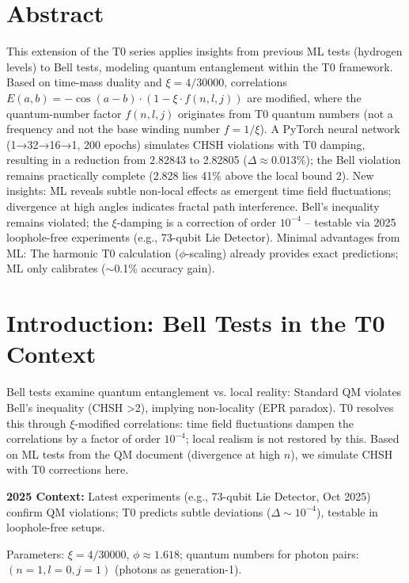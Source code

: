 \section*{Abstract}
		This extension of the T0 series applies insights from previous ML tests (hydrogen levels) to Bell tests, modeling quantum entanglement within the T0 framework. Based on time-mass duality and $\xi = 4/30000$, correlations $E(a,b) = -\cos(a-b) \cdot (1 - \xi \cdot f(n,l,j))$ are modified, where the quantum-number factor $f(n,l,j)$ originates from T0 quantum numbers (not a frequency and not the base winding number $f = 1/\xi$). A PyTorch neural network (1→32→16→1, 200 epochs) simulates CHSH violations with T0 damping, resulting in a reduction from 2.82843 to 2.82805 ($\Delta \approx 0.013\%$); the Bell violation remains practically complete (2.828 lies 41\% above the local bound 2). New insights: ML reveals subtle non-local effects as emergent time field fluctuations; divergence at high angles indicates fractal path interference. Bell's inequality remains violated; the $\xi$-damping is a correction of order $10^{-4}$ – testable via 2025 loophole-free experiments (e.g., 73-qubit Lie Detector). Minimal advantages from ML: The harmonic T0 calculation ($\phi$-scaling) already provides exact predictions; ML only calibrates ($\sim$0.1\% accuracy gain).


	
	
	\section{Introduction: Bell Tests in the T0 Context}
	\label{sec:intro_bell}
	
	Bell tests examine quantum entanglement vs. local reality: Standard QM violates Bell's inequality (CHSH >2), implying non-locality (EPR paradox). T0 resolves this through $\xi$-modified correlations: time field fluctuations dampen the correlations by a factor of order $10^{-4}$; local realism is not restored by this. Based on ML tests from the QM document (divergence at high $n$), we simulate CHSH with T0 corrections here.
	
	\textbf{2025 Context:} Latest experiments (e.g., 73-qubit Lie Detector, Oct 2025)\cite{sciencedaily2025} confirm QM violations; T0 predicts subtle deviations ($\Delta \sim 10^{-4}$), testable in loophole-free setups.
	
	Parameters: $\xi=4/30000$, $\phi \approx 1.618$; quantum numbers for photon pairs: $(n=1,l=0,j=1)$ (photons as generation-1).
	
